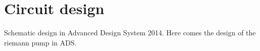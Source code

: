 \chapter{Circuit design}
Schematic design in Advanced Design System 2014. 
Here comes the design of the riemann pump in ADS.
